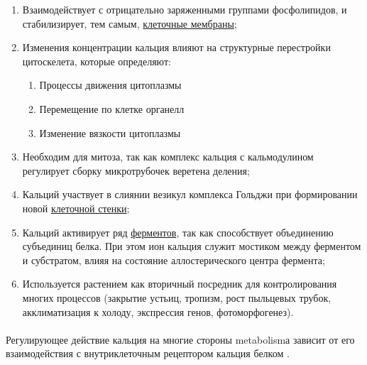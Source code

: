 \begin{enumerate}
	\item Взаимодействует с отрицательно заряженными группами фосфолипидов, и  стабилизирует, тем самым, \hyperlink{plasmolema}{клеточные мембраны};
	\item Изменения концентрации кальция влияют на структурные перестройки цитоскелета, которые определяют:
	\begin{enumerate}
	\item Процессы движения цитоплазмы
	\item Перемещение по клетке органелл
	\item Изменение вязкости цитоплазмы
	\end{enumerate}	
	
	\item Необходим для митоза, так как комплекс кальция с кальмодулином регулирует сборку микротрубочек веретена деления;
	
	\item Кальций участвует в слиянии везикул комплекса Гольджи при формировании новой \hyperlink{cell_wall}{клеточной стенки};
	
	\item Кальций активирует ряд \hyperlink{enzimes}{ферментов}, так как способствует объединению субъединиц белка. При этом ион кальция служит мостиком между ферментом и субстратом, влияя на состояние аллостерического центра фермента;
	  
	\item Используется растением как вторичный посредник для контролирования многих процессов (закрытие устьиц, тропизм, рост пыльцевых трубок, акклиматизация к холоду, экспрессия генов, фотоморфогенез).
\end{enumerate}

\paragraph*{}Регулирующее действие кальция на многие стороны \gls{metabolism}а зависит от его взаимодействия с внутриклеточным рецептором кальция белком . 


